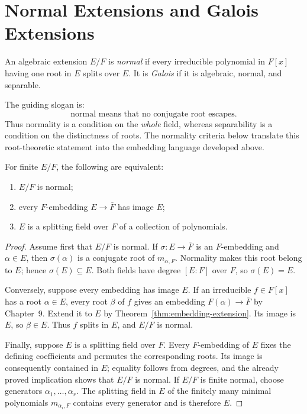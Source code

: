 \section{Normal Extensions and Galois Extensions}
\begin{definition}
An algebraic extension \(E/F\) is \emph{normal} if every irreducible
polynomial in \(F[x]\) having one root in \(E\) splits over \(E\).  It is
\emph{Galois} if it is algebraic, normal, and separable.
\end{definition}

The guiding slogan is:
\[
\text{normal means that no conjugate root escapes.}
\]
Thus normality is a condition on the \emph{whole} field, whereas separability
is a condition on the distinctness of roots.  The normality criteria below
translate this root-theoretic statement into the embedding language developed
above.

\begin{theorem}\label{thm:normality-criteria}
For finite \(E/F\), the following are equivalent:
\begin{enumerate}
\item \(E/F\) is normal;
\item every \(F\)-embedding \(E\to\overline F\) has image \(E\);
\item \(E\) is a splitting field over \(F\) of a collection of polynomials.
\end{enumerate}
\end{theorem}
\begin{proof}
Assume first that \(E/F\) is normal.  If \(\sigma:E\to\overline F\) is an
\(F\)-embedding and \(\alpha\in E\), then \(\sigma(\alpha)\) is a conjugate
root of \(m_{\alpha,F}\).  Normality makes this root belong to \(E\); hence
\(\sigma(E)\subseteq E\).  Both fields have degree \([E:F]\) over \(F\), so
\(\sigma(E)=E\).

Conversely, suppose every embedding has image \(E\).  If an irreducible
\(f\in F[x]\) has a root \(\alpha\in E\), every root \(\beta\) of \(f\) gives
an embedding \(F(\alpha)\to\overline F\) by Chapter~9.  Extend it to \(E\)
by Theorem~\ref{thm:embedding-extension}.  Its image is \(E\), so
\(\beta\in E\).  Thus \(f\) splits in \(E\), and \(E/F\) is normal.

Finally, suppose \(E\) is a splitting field over \(F\).  Every
\(F\)-embedding of \(E\) fixes the defining coefficients and permutes the
corresponding roots.  Its image is consequently contained in \(E\); equality
follows from degrees, and the already proved implication shows that \(E/F\)
is normal.  If \(E/F\) is
finite normal, choose generators \(\alpha_1,\ldots,\alpha_r\).  The splitting
field in \(E\) of the finitely many minimal polynomials
\(m_{\alpha_i,F}\) contains every generator and is therefore \(E\).
\end{proof}

